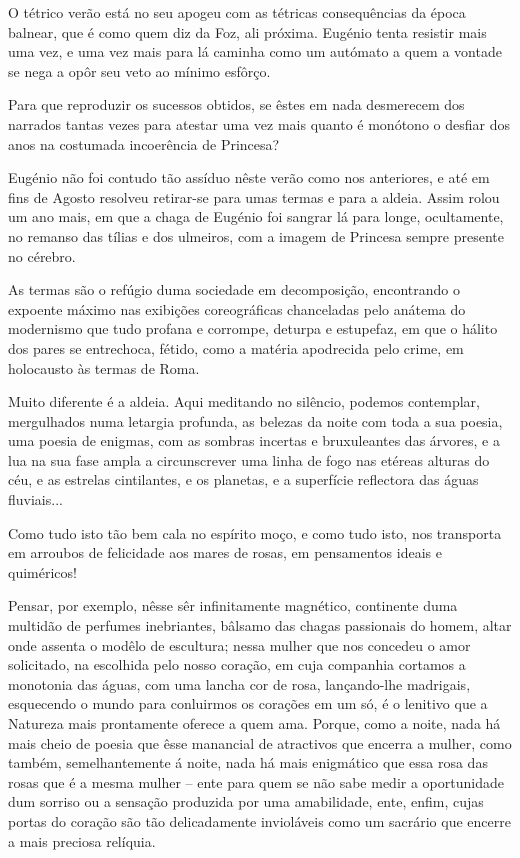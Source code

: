 \documentclass[9pt]{article}
\begin{document}
O tétrico verão está no seu apogeu com as tétricas consequências da
época balnear, que é como quem diz da Foz, ali próxima. Eugé\-nio tenta resistir mais uma vez, e uma vez mais para lá caminha como um autómato a quem a vontade se nega a opôr seu veto ao mí\-ni\-mo esfôrço.

Para que reproduzir os sucessos obtidos, se êstes em nada desmerecem
dos narrados tantas vezes para atestar uma vez mais quanto é monótono o
desfiar dos anos na costumada incoerência de Princesa?

Eugé\-nio não foi contudo tão assíduo nês\-te verão como nos anteriores,
e até em fins de Agosto resolveu retirar-se para umas termas e para a aldeia. Assim rolou um ano mais, em que a chaga de Eugé\-nio foi sangrar lá
para longe, ocultamente, no remanso das tílias e dos ulmeiros, com a imagem de
Princesa sempre presente no cérebro.

As termas são o refúgio duma sociedade em decomposi\-ção, encontrando
o expoente máximo nas exibi\-ções coreográfi\-cas chanceladas pelo anátema
do modernismo que tudo profana e corrompe, deturpa e estupefaz, em que o
hálito dos pares se entrechoca, fétido, como a ma\-té\-ria apodrecida pelo crime, em holocausto às termas de Roma.

Muito diferente é a aldeia. Aqui meditando no silêncio, podemos contemplar, mergu\-lhados numa letargia profunda, as belezas da noite com toda
a sua poesia, uma poesia de enigmas, com as sombras incertas e bruxuleantes das árvores, e a lua na sua fase ampla a circunscrever uma linha de
fogo nas etéreas alturas do céu, e as estrelas cintilantes, e os planetas,
e a superfície reflectora das águas fluviais...

Como tudo isto tão bem cala no espírito moço, e como tudo isto, nos transporta em arroubos de felicidade aos mares de rosas, em pensamentos ideais
e quiméricos!

Pensar, por exemplo, nêsse sêr infinitamente magnético, continente
duma multidão de perfumes inebriantes, bâlsamo das chagas passionais do
homem, altar onde assenta o modêlo de escultura; nessa mu\-lher que nos concedeu o amor solicitado, na esco\-lhida pelo nosso cora\-ção, em cuja companhia cortamos a monotonia das águas, com uma lancha cor de rosa, lan\-çando-\-lhe madrigais, esquecendo o mundo para conluirmos os cora\-ções em um só,
é o lenitivo que a Natureza mais prontamente oferece a quem ama. Porque,
como a noite, nada há mais cheio de poesia que êsse manancial de atractivos
que encerra a mu\-lher, como também, seme\-lhantemente á noite, nada há mais
enigmático que essa rosa das rosas que é a mesma mu\-lher -- ente para
quem se não sabe medir a oportunidade dum sorriso ou a sensa\-ção produzida
por uma amabilidade, ente, enfim, cujas portas do cora\-ção são tão delicadamente invioláveis como um sacrário que encerre a mais preciosa relíquia.
\end{document}
